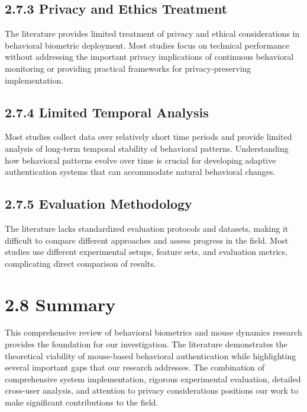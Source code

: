\documentclass[
  12pt,
  a4paper,
]{report}
\begin{document}
\subsection{2.7.3 Privacy and Ethics
Treatment}\label{privacy-and-ethics-treatment}

The literature provides limited treatment of privacy and ethical
considerations in behavioral biometric deployment. Most studies focus on
technical performance without addressing the important privacy
implications of continuous behavioral monitoring or providing practical
frameworks for privacy-preserving implementation.

\subsection{2.7.4 Limited Temporal
Analysis}\label{limited-temporal-analysis}

Most studies collect data over relatively short time periods and provide
limited analysis of long-term temporal stability of behavioral patterns.
Understanding how behavioral patterns evolve over time is crucial for
developing adaptive authentication systems that can accommodate natural
behavioral changes.

\subsection{2.7.5 Evaluation Methodology}\label{evaluation-methodology}

The literature lacks standardized evaluation protocols and datasets,
making it difficult to compare different approaches and assess progress
in the field. Most studies use different experimental setups, feature
sets, and evaluation metrics, complicating direct comparison of results.

\section{2.8 Summary}\label{summary-1}

This comprehensive review of behavioral biometrics and mouse dynamics
research provides the foundation for our investigation. The literature
demonstrates the theoretical viability of mouse-based behavioral
authentication while highlighting several important gaps that our
research addresses. The combination of comprehensive system
implementation, rigorous experimental evaluation, detailed cross-user
analysis, and attention to privacy considerations positions our work to
make significant contributions to the field.
\end{document}
